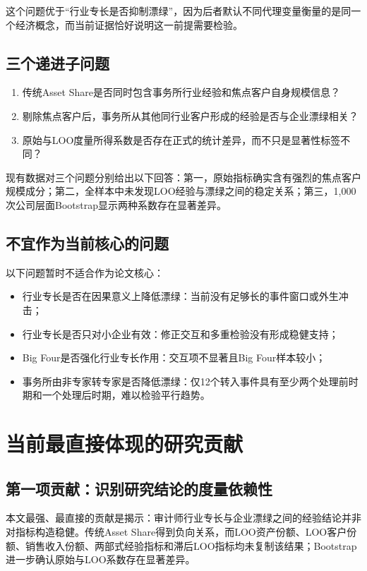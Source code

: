 \documentclass[12pt,a4paper]{article}
\begin{document}
这个问题优于“行业专长是否抑制漂绿”，因为后者默认不同代理变量衡量的是同一个经济概念，而当前证据恰好说明这一前提需要检验。

\subsection{三个递进子问题}

\begin{enumerate}
  \item 传统Asset Share是否同时包含事务所行业经验和焦点客户自身规模信息？
  \item 剔除焦点客户后，事务所从其他同行业客户形成的经验是否与企业漂绿相关？
  \item 原始与LOO度量所得系数是否存在正式的统计差异，而不只是显著性标签不同？
\end{enumerate}

现有数据对三个问题分别给出以下回答：第一，原始指标确实含有强烈的焦点客户规模成分；第二，全样本中未发现LOO经验与漂绿之间的稳定关系；第三，1,000次公司层面Bootstrap显示两种系数存在显著差异。

\subsection{不宜作为当前核心的问题}

以下问题暂时不适合作为论文核心：

\begin{itemize}
  \item 行业专长是否在因果意义上降低漂绿：当前没有足够长的事件窗口或外生冲击；
  \item 行业专长是否只对小企业有效：修正交互和多重检验没有形成稳健支持；
  \item Big Four是否强化行业专长作用：交互项不显著且Big Four样本较小；
  \item 事务所由非专家转专家是否降低漂绿：仅12个转入事件具有至少两个处理前时期和一个处理后时期，难以检验平行趋势。
\end{itemize}

\section{当前最直接体现的研究贡献}

\subsection{第一项贡献：识别研究结论的度量依赖性}

本文最强、最直接的贡献是揭示：审计师行业专长与企业漂绿之间的经验结论并非对指标构造稳健。传统Asset Share得到负向关系，而LOO资产份额、LOO客户份额、销售收入份额、两部式经验指标和滞后LOO指标均未复制该结果；Bootstrap进一步确认原始与LOO系数存在显著差异。
\end{document}
